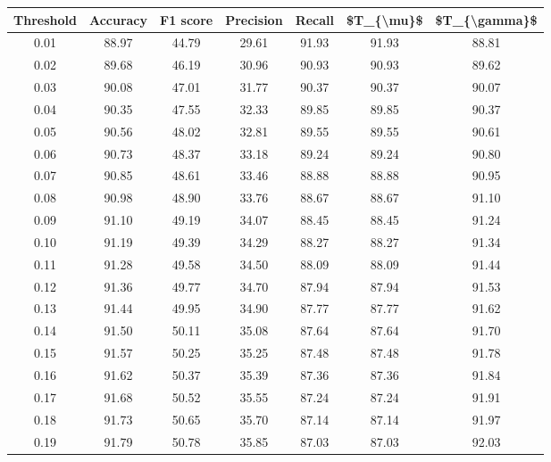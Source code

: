 \begin{tabular}{|c|c|c|c|c|c|c|}
\hline
 Threshold &  Accuracy &  F1 score &  Precision &  Recall &  \$T\_\{\textbackslash mu\}\$ &  \$T\_\{\textbackslash gamma\}\$ \\
\hline
      0.01 &     88.97 &     44.79 &      29.61 &   91.93 &      91.93 &         88.81 \\
      0.02 &     89.68 &     46.19 &      30.96 &   90.93 &      90.93 &         89.62 \\
      0.03 &     90.08 &     47.01 &      31.77 &   90.37 &      90.37 &         90.07 \\
      0.04 &     90.35 &     47.55 &      32.33 &   89.85 &      89.85 &         90.37 \\
      0.05 &     90.56 &     48.02 &      32.81 &   89.55 &      89.55 &         90.61 \\
      0.06 &     90.73 &     48.37 &      33.18 &   89.24 &      89.24 &         90.80 \\
      0.07 &     90.85 &     48.61 &      33.46 &   88.88 &      88.88 &         90.95 \\
      0.08 &     90.98 &     48.90 &      33.76 &   88.67 &      88.67 &         91.10 \\
      0.09 &     91.10 &     49.19 &      34.07 &   88.45 &      88.45 &         91.24 \\
      0.10 &     91.19 &     49.39 &      34.29 &   88.27 &      88.27 &         91.34 \\
      0.11 &     91.28 &     49.58 &      34.50 &   88.09 &      88.09 &         91.44 \\
      0.12 &     91.36 &     49.77 &      34.70 &   87.94 &      87.94 &         91.53 \\
      0.13 &     91.44 &     49.95 &      34.90 &   87.77 &      87.77 &         91.62 \\
      0.14 &     91.50 &     50.11 &      35.08 &   87.64 &      87.64 &         91.70 \\
      0.15 &     91.57 &     50.25 &      35.25 &   87.48 &      87.48 &         91.78 \\
      0.16 &     91.62 &     50.37 &      35.39 &   87.36 &      87.36 &         91.84 \\
      0.17 &     91.68 &     50.52 &      35.55 &   87.24 &      87.24 &         91.91 \\
      0.18 &     91.73 &     50.65 &      35.70 &   87.14 &      87.14 &         91.97 \\
      0.19 &     91.79 &     50.78 &      35.85 &   87.03 &      87.03 &         92.03 \\

\end{tabular}
